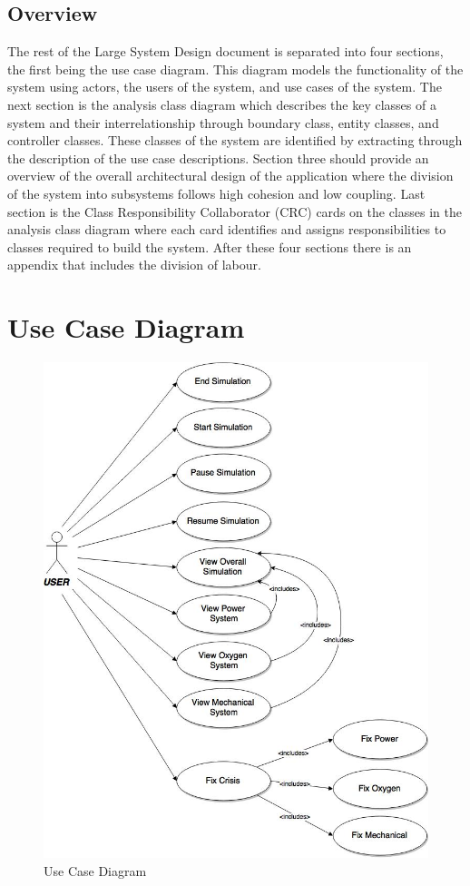 \documentclass[12pt, titlepage]{article}
\newcommand\tab[1][1cm]{\hspace*{#1}}
\begin{document}
\subsection{Overview}
\label{sub:overview}
\tab The rest of the Large System Design document is separated into four sections, the first being the use case diagram. This diagram models the functionality of the system using actors, the users of the system, and use cases of the system. The next section is the analysis class diagram which describes the key classes of a system and their interrelationship through boundary class, entity classes, and controller classes. These classes of the system are identified by extracting through the description of the use case descriptions.  Section three should provide an overview of the overall architectural design of the application where the division of the system into subsystems follows high cohesion and low coupling. Last section is the Class Responsibility Collaborator (CRC) cards on the classes in the analysis class diagram where each card identifies and assigns responsibilities to classes required to build the system. After these four sections there is an appendix that includes the division of labour.

\newpage
\section{Use Case Diagram}
\label{sec:use_case_diagram}
\begin{figure}[ht!]
\centering
\includegraphics[width=120mm]{UseCase.jpg}
\caption{Use Case Diagram \label{usecase}}
\end{figure}
\end{document}
